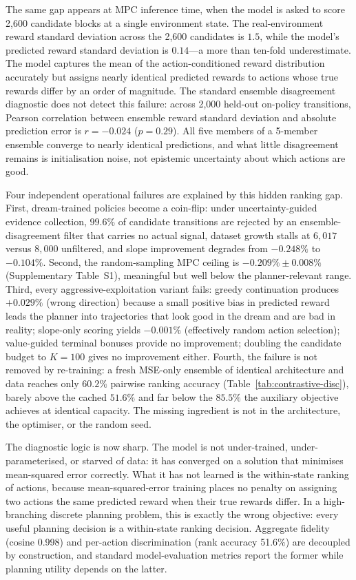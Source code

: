 \documentclass[11pt]{article}
\begin{document}
The same gap appears at MPC inference time, when the model is asked to score 2{,}600 candidate blocks at a single environment state. The real-environment reward standard deviation across the 2{,}600 candidates is $1.5$, while the model's predicted reward standard deviation is $0.14$---a more than ten-fold underestimate. The model captures the mean of the action-conditioned reward distribution accurately but assigns nearly identical predicted rewards to actions whose true rewards differ by an order of magnitude. The standard ensemble disagreement diagnostic does not detect this failure: across 2{,}000 held-out on-policy transitions, Pearson correlation between ensemble reward standard deviation and absolute prediction error is $r = -0.024$ ($p = 0.29$). All five members of a 5-member ensemble converge to nearly identical predictions, and what little disagreement remains is initialisation noise, not epistemic uncertainty about which actions are good.

Four independent operational failures are explained by this hidden ranking gap. First, dream-trained policies become a coin-flip: under uncertainty-guided evidence collection, $99.6\%$ of candidate transitions are rejected by an ensemble-disagreement filter that carries no actual signal, dataset growth stalls at $6{,}017$ versus $8{,}000$ unfiltered, and slope improvement degrades from $-0.248\%$ to $-0.104\%$. Second, the random-sampling MPC ceiling is $-0.209\% \pm 0.008\%$ (Supplementary Table~S1), meaningful but well below the planner-relevant range. Third, every aggressive-exploitation variant fails: greedy continuation produces $+0.029\%$ (wrong direction) because a small positive bias in predicted reward leads the planner into trajectories that look good in the dream and are bad in reality; slope-only scoring yields $-0.001\%$ (effectively random action selection); value-guided terminal bonuses provide no improvement; doubling the candidate budget to $K{=}100$ gives no improvement either. Fourth, the failure is not removed by re-training: a fresh MSE-only ensemble of identical architecture and data reaches only $60.2\%$ pairwise ranking accuracy (Table~\ref{tab:contrastive-disc}), barely above the cached $51.6\%$ and far below the $85.5\%$ the auxiliary objective achieves at identical capacity. The missing ingredient is not in the architecture, the optimiser, or the random seed.

The diagnostic logic is now sharp. The model is not under-trained, under-parameterised, or starved of data: it has converged on a solution that minimises mean-squared error correctly. What it has not learned is the within-state ranking of actions, because mean-squared-error training places no penalty on assigning two actions the same predicted reward when their true rewards differ. In a high-branching discrete planning problem, this is exactly the wrong objective: every useful planning decision is a within-state ranking decision. Aggregate fidelity (cosine 0.998) and per-action discrimination (rank accuracy 51.6\%) are decoupled by construction, and standard model-evaluation metrics report the former while planning utility depends on the latter.
\end{document}
